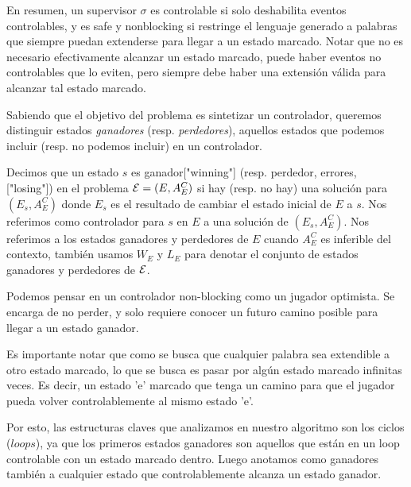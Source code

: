 En resumen, un supervisor $\sigma$ es controlable si solo deshabilita eventos controlables, y es safe y nonblocking si restringe el lenguaje generado a palabras que siempre puedan extenderse para llegar a un estado marcado. Notar que no es necesario efectivamente alcanzar un estado marcado, puede haber eventos no controlables que lo eviten, pero siempre debe haber una extensión válida para alcanzar tal estado marcado.

Sabiendo que el objetivo del problema es sintetizar un controlador, queremos distinguir estados \textit{ganadores} (resp. \textit{perdedores}), aquellos estados que podemos incluir (resp. no podemos incluir) en un controlador. 

\begin{notation}
	Decimos que un estado $s$ es ganador["winning"] (resp. perdedor, errores, ["losing"]) en el problema $\mathcal{E} = (E, A_E^C)$ 
	si hay (resp. no hay) una solución para $(E_s, A_E^C)$ donde $E_s$ es el resultado de cambiar el estado inicial de $E$ a $s$.
	Nos referimos como controlador para $s$ en $E$ a una solución de $(E_s, A_E^C)$.
	Nos referimos a los estados ganadores y perdedores de $E$ cuando $A_E^C$ es inferible del contexto, también usamos $W_E$ y $L_E$ para denotar el conjunto de estados ganadores y perdedores de $\mathcal{E}$.
\end{notation}

Podemos pensar en un controlador non-blocking como un jugador optimista. Se encarga de no perder, y solo requiere conocer un futuro camino posible para llegar a un estado ganador.


Es importante notar que como se busca que cualquier palabra sea extendible a otro estado marcado, lo que se busca es pasar por algún estado marcado infinitas veces. Es decir, un estado 'e' marcado que tenga un camino para que el jugador pueda volver controlablemente al mismo estado 'e'.

Por esto, las estructuras claves que analizamos en nuestro algoritmo son los ciclos ($loops$), ya que los primeros estados ganadores son aquellos que están en un loop controlable con un estado marcado dentro. Luego anotamos como ganadores también a cualquier estado que controlablemente alcanza un estado ganador.

